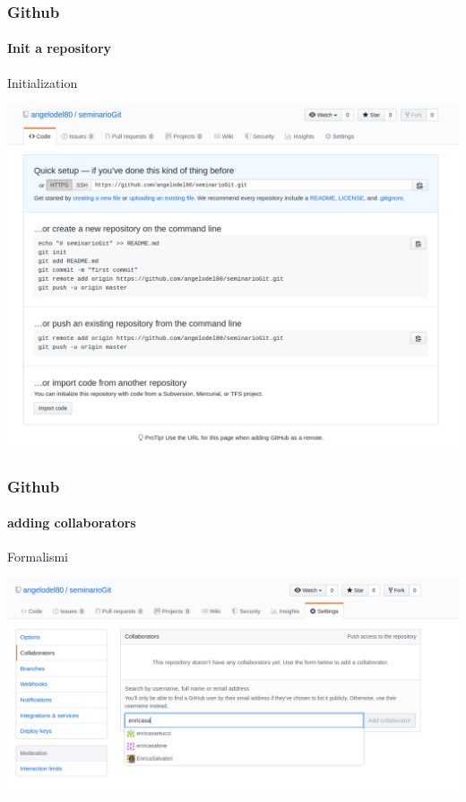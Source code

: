 
\begin{frame}
\frametitle{Github}
\framesubtitle{Init a repository}
\addtocounter{nframe}{1}

\begin{block}{Initialization}
	\begin{center}
		\includegraphics[width=.9\textwidth]{imgs/GitHub-RepoInit.png}
	\end{center}
\end{block}

\end{frame}

\begin{frame}
	\frametitle{Github}
	\framesubtitle{adding collaborators}
	\addtocounter{nframe}{1}
	
	\begin{block}{Formalismi}
		\begin{center}
			\includegraphics[width=.9\textwidth]{imgs/github-Collaborators.png}
		\end{center}
	\end{block}
	
\end{frame}

